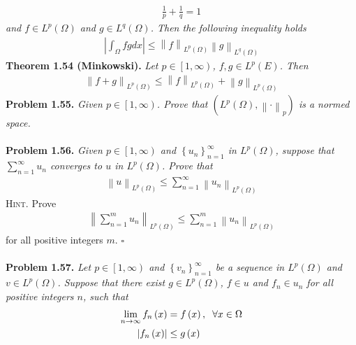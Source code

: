 \documentclass[a4paper]{article}
\numberwithin{equation}{section}
\begin{document}
\begin{align}
\frac{1}{p} + \frac{1}{q} = 1
\end{align}
\textit{and $f\in L^p\left(\Omega\right)$ and $g\in L^q\left(\Omega\right)$. Then the following inequality holds}
\begin{align}
\left| {\int_\Omega  {fgdx} } \right| \le {\left\| f \right\|_{{L^p}\left( \Omega  \right)}}{\left\| g \right\|_{{L^q}\left( \Omega  \right)}}
\end{align}
\textbf{Theorem 1.54 (Minkowski).} \textit{Let $p \in \left[1,\infty\right)$, $f,g \in L^p\left(E\right)$. Then}
\begin{align}
{\left\| {f + g} \right\|_{{L^p}\left( \Omega  \right)}} \le {\left\| f \right\|_{{L^p}\left( \Omega  \right)}} + {\left\| g \right\|_{{L^p}\left( \Omega  \right)}}
\end{align}
\textbf{Problem 1.55.} \textit{Given $p\in \left[1,\infty\right)$. Prove that $\left( {{L^p}\left( \Omega  \right),{{\left\|  \cdot  \right\|}_p}} \right)$ is a normed space.}\\
\\
\textbf{Problem 1.56.} \textit{Given $p\in \left[1,\infty\right)$ and $\left\{ {{u_n}} \right\}_{n = 1}^\infty$ in $L^p\left(\Omega\right)$, suppose that $\sum\limits_{n = 1}^\infty  {{u_n}} $ converges to $u$ in $L^p\left(\Omega\right)$. Prove that}
\begin{align}
{\left\| u \right\|_{{L^p}\left( \Omega  \right)}} \le \sum\limits_{n = 1}^\infty  {{{\left\| {{u_n}} \right\|}_{{L^p}\left( \Omega  \right)}}} 
\end{align}
\textsc{Hint.} Prove
\begin{align}
{\left\| {\sum\limits_{n = 1}^m {{u_n}} } \right\|_{{L^p}\left( \Omega  \right)}} \le \sum\limits_{n = 1}^m {{{\left\| {{u_n}} \right\|}_{{L^p}\left( \Omega  \right)}}} 
\end{align}
for all positive integers $m$. \hfill $\square$\\
\\
\textbf{Problem 1.57.} \textit{Let $p\in \left[1,\infty\right)$ and $\left\{ {{v_n}} \right\}_{n = 1}^\infty $ be a sequence in $L^p\left(\Omega\right)$ and $v\in L^p\left(\Omega\right)$. Suppose that there exist $g\in L^p\left(\Omega\right)$, $f\in u$ and $f_n\in u_n$ for all positive integers $n$, such that}
\begin{align}
\mathop {\lim }\limits_{n \to \infty } {f_n}\left( x \right) &= f\left( x \right),\hspace{0.2cm}\forall x \in \Omega \\
\left| {{f_n}\left( x \right)} \right| &\le g\left( x \right)
\end{align}
\end{document}
